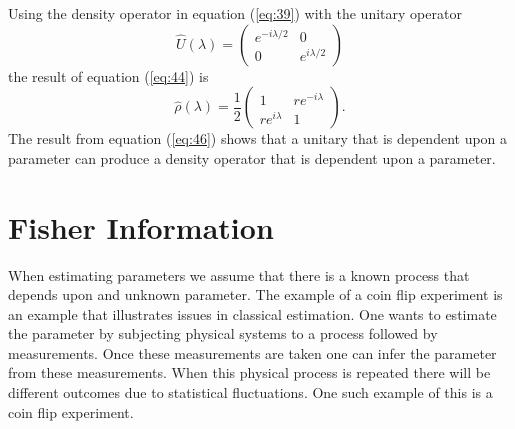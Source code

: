 \documentclass[twocolumn]{article}
\begin{document}
Using the density operator in equation (\ref{eq:39}) with the unitary operator
\begin{equation} \label{eq:45}
\hat{U}(\lambda)=
\begin{pmatrix}
e^{-i\lambda/2} & 0 \\
0 & e^{i\lambda/2}
\end{pmatrix}
\end{equation}
the result of equation (\ref{eq:44}) is
\begin{equation} \label{eq:46}
\hat{\rho}(\lambda)=\frac{1}{2}
\begin{pmatrix}
1 & re^{-i\lambda} \\
re^{i\lambda} & 1
\end{pmatrix}.
\end{equation}
The result from equation (\ref{eq:46}) shows that a unitary that is dependent upon a parameter can produce a density operator that is dependent upon a parameter.
\section*{Fisher Information}
When estimating parameters we assume that there is a known process that depends upon and unknown parameter. The example of a coin flip experiment is an example that illustrates issues in classical estimation. One wants to estimate the parameter by subjecting physical systems to a process followed by measurements. Once these measurements are taken one can infer the parameter from these measurements. When this physical process is repeated there will be different outcomes due to statistical fluctuations. One such example of this is a coin flip experiment.
\end{document}
